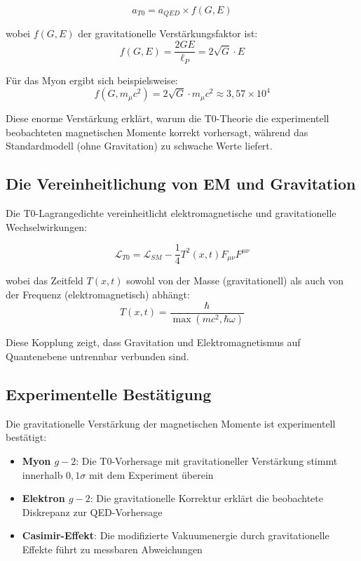 \documentclass[12pt,a4paper]{article}
\theoremstyle{definition}
\begin{document}
	\begin{equation}
		a_{T0} = a_{QED} \times f(G, E)
	\end{equation}
	
	wobei $f(G, E)$ der gravitationelle Verstärkungsfaktor ist:
	\begin{equation}
		f(G, E) = \frac{2GE}{\ell_P} = 2\sqrt{G} \cdot E
	\end{equation}
	
	Für das Myon ergibt sich beispielsweise:
	\begin{equation}
		f(G, m_\mu c^2) = 2\sqrt{G} \cdot m_\mu c^2 \approx 3{,}57 \times 10^4
	\end{equation}
	
	Diese enorme Verstärkung erklärt, warum die T0-Theorie die experimentell beobachteten magnetischen Momente korrekt vorhersagt, während das Standardmodell (ohne Gravitation) zu schwache Werte liefert.
	
	\subsection{Die Vereinheitlichung von EM und Gravitation}
	
	Die T0-Lagrangedichte vereinheitlicht elektromagnetische und gravitationelle Wechselwirkungen:
	
	\begin{equation}
		\mathcal{L}_{T0} = \mathcal{L}_{SM} - \frac{1}{4}T^2(x,t) F_{\mu\nu} F^{\mu\nu}
	\end{equation}
	
	wobei das Zeitfeld $T(x,t)$ sowohl von der Masse (gravitationell) als auch von der Frequenz (elektromagnetisch) abhängt:
	\begin{equation}
		T(x,t) = \frac{\hbar}{\max(mc^2, \hbar\omega)}
	\end{equation}
	
	Diese Kopplung zeigt, dass Gravitation und Elektromagnetismus auf Quantenebene untrennbar verbunden sind.
	
	\subsection{Experimentelle Bestätigung}
	
	Die gravitationelle Verstärkung der magnetischen Momente ist experimentell bestätigt:
	
	\begin{itemize}
		\item \textbf{Myon $g-2$}: Die T0-Vorhersage mit gravitationeller Verstärkung stimmt innerhalb $0{,}1\sigma$ mit dem Experiment überein
		\item \textbf{Elektron $g-2$}: Die gravitationelle Korrektur erklärt die beobachtete Diskrepanz zur QED-Vorhersage
		\item \textbf{Casimir-Effekt}: Die modifizierte Vakuumenergie durch gravitationelle Effekte führt zu messbaren Abweichungen
	\end{itemize}
	
\end{document}
